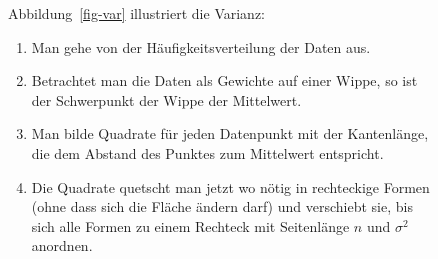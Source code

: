 \documentclass[
  a4paper,
]{scrbook}
\providecommand{\tightlist}{%
  \setlength{\itemsep}{0pt}\setlength{\parskip}{0pt}}\usepackage{longtable,booktabs,array}
\theoremstyle{definition}
\theoremstyle{definition}
\theoremstyle{definition}
\theoremstyle{remark}
\begin{document}
\begin{figure}

\begin{minipage}{0.60\linewidth}
Abbildung~\ref{fig-var} illustriert die Varianz:

\begin{enumerate}
\def\labelenumi{\arabic{enumi}.}
\tightlist
\item
  Man gehe von der Häufigkeitsverteilung der Daten aus.
\item
  Betrachtet man die Daten als Gewichte auf einer Wippe, so ist der
  Schwerpunkt der Wippe der Mittelwert.
\item
  Man bilde Quadrate für jeden Datenpunkt mit der Kantenlänge, die dem
  Abstand des Punktes zum Mittelwert entspricht.
\item
  Die Quadrate quetscht man jetzt wo nötig in rechteckige Formen (ohne
  dass sich die Fläche ändern darf) und verschiebt sie, bis sich alle
  Formen zu einem Rechteck mit Seitenlänge \(n\) und \(\sigma^2\)
  anordnen.
\end{enumerate}

\end{minipage}%
%
\begin{minipage}{0.40\linewidth}

\begin{figure}[H]

\centering{

}
\end{figure}
\end{minipage}
\end{figure}
\end{document}
